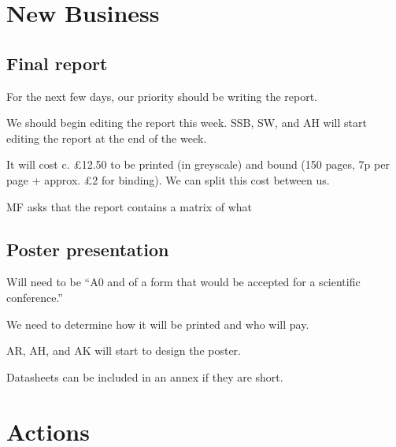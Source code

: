 \documentclass[a4paper,11pt,twoside,class=meetingmins,crop=false]{standalone}
\begin{document}
\section{New Business}
\begin{items}
    \subsection{Final report}
        \item For the next few days, our priority should be writing the report.
        \item We should begin editing the report this week. SSB, SW, and AH will start editing the report at the end of the week.
        \item It will cost c. \pounds{12.50} to be printed (in greyscale) and bound (150 pages, 7p per page + approx. \pounds{2} for binding). We can split this cost between us.
        \item MF asks that the report contains a matrix of what
    \subsection{Poster presentation}
        \item Will need to be ``A0 and of a form that would be accepted for a scientific conference.''
        \item We need to determine how it will be printed and who will pay.
        \item AR, AH, and AK will start to design the poster.
        \item Datasheets can be included in an annex if they are short.
\end{items}

\vspace{1em}
\vspace{1em}

\section{Actions}
\begin{items}
\end{items}
\end{document}
